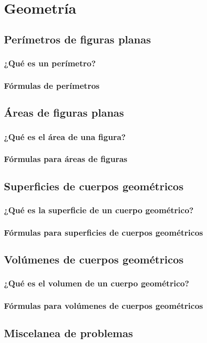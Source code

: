 \chapter{Geometría}

\section{Perímetros de figuras planas}
\subsection{¿Qué es un perímetro?}
\subsection{Fórmulas de perímetros}

\section{Áreas de figuras planas}
\subsection{¿Qué es el área de una figura?}
\subsection{Fórmulas para áreas de figuras}

\section{Superficies de cuerpos geométricos}
\subsection{¿Qué es la superficie de un cuerpo geométrico?}
\subsection{Fórmulas para superficies de cuerpos geométricos}

\section{Volúmenes de cuerpos geométricos}
\subsection{¿Qué es el volumen de un cuerpo geométrico?}
\subsection{Fórmulas para volúmenes de cuerpos geométricos}

\section{Miscelanea de problemas}